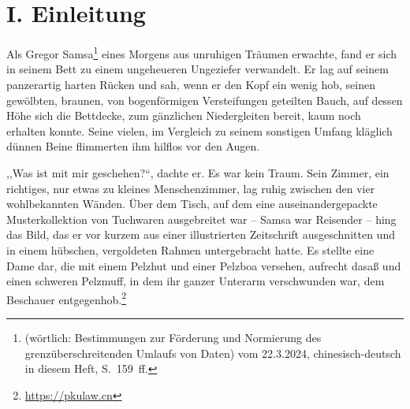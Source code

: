 \documentclass[]{zchinr}
\begin{document}

\printtitle

\section{I. Einleitung}

Als Gregor Samsa\footnote{ (wörtlich: Bestimmungen zur Förderung und Normierung des grenzüberschreitenden Umlaufs von Daten) vom 22.3.2024, chinesisch-deutsch in diesem Heft, S.~159~ff.} eines Morgens aus unruhigen Träumen erwachte, fand er sich in seinem Bett zu einem ungeheueren Ungeziefer verwandelt. Er lag auf seinem panzerartig harten Rücken und sah, wenn er den Kopf ein wenig hob, seinen gewölbten, braunen, von bogenförmigen Versteifungen geteilten Bauch, auf dessen Höhe sich die Bettdecke, zum gänzlichen Niedergleiten bereit, kaum noch erhalten konnte. Seine vielen, im Vergleich zu seinem sonstigen Umfang kläglich dünnen Beine flimmerten ihm hilflos vor den Augen.

,,Was ist mit mir geschehen?``, dachte er. Es war kein Traum. Sein Zimmer, ein richtiges, nur etwas zu kleines Menschenzimmer, lag ruhig zwischen den vier wohlbekannten Wänden. Über dem Tisch, auf dem eine auseinandergepackte Musterkollektion von Tuchwaren ausgebreitet war -- Samsa war Reisender -- hing das Bild, das er vor kurzem aus einer illustrierten Zeitschrift ausgeschnitten und in einem hübschen, vergoldeten Rahmen untergebracht hatte. Es stellte eine Dame dar, die mit einem Pelzhut und einer Pelzboa versehen, aufrecht dasaß und einen schweren Pelzmuff, in dem ihr ganzer Unterarm verschwunden war, dem Beschauer entgegenhob.\footnote{\url{https://pkulaw.cn}}



\printtitle
\end{document}
